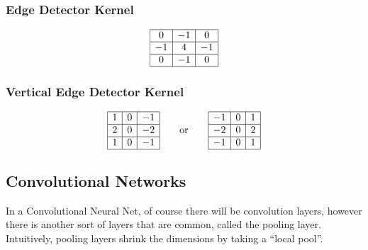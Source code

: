 \documentclass[11pt]{article}
\begin{document}
\subsubsection{Edge Detector Kernel}
\begin{equation}
    \begin{array}{|c|c|c|}
        \hline 0 & {-1} & {0} \\
        \hline-1 & {4} & {-1} \\
        \hline 0 & {-1} & {0} \\
        \hline
    \end{array}
\end{equation}

\subsubsection{Vertical Edge Detector Kernel}
    \begin{equation}
        \begin{array}{|c|c|c|}
        \hline 1 & {0} & {-1} \\
        \hline 2 & {0} & {-2} \\
        \hline 1 & {0} & {-1} \\
        \hline
    \end{array}
    \quad \quad \text{or} \quad \quad
    \begin{array}{|c|c|c|}
        \hline -1 & {0} & {1} \\
        \hline -2 & {0} & {2} \\
        \hline -1 & {0} & {1} \\
        \hline
    \end{array}
\end{equation}

\subsection{Convolutional Networks}
In a Convolutional Neural Net, of course there will be convolution layers, however there is another sort of layers that are common, called the pooling layer. Intuitively, pooling layers shrink the dimensions by taking a ``local pool''.
\end{document}
